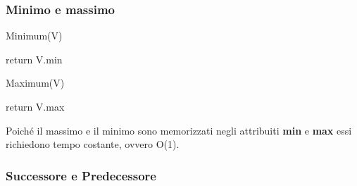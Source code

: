 \documentclass{article}
\begin{document}
        \subsubsection{Minimo e massimo}
            \begin{algorithm}
                \caption{Minimum(V)}
                    {return V.min}
            \end{algorithm}
           \begin{algorithm}
                \caption{Maximum(V)}
                    {return V.max}
            \end{algorithm}
            
            Poiché il massimo e il minimo sono memorizzati negli attribuiti \textbf{min} e \textbf{max} essi richiedono tempo costante, ovvero O(1).
        
        \subsubsection{Successore e Predecessore}
            
            
\end{document}
